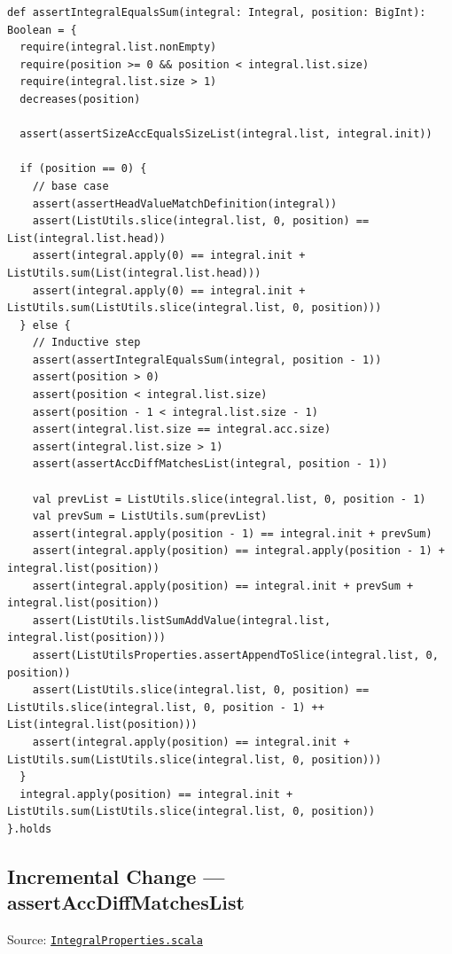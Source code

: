 \begin{lstlisting}[style=scala]
def assertIntegralEqualsSum(integral: Integral, position: BigInt): Boolean = {
  require(integral.list.nonEmpty)
  require(position >= 0 && position < integral.list.size)
  require(integral.list.size > 1)
  decreases(position)

  assert(assertSizeAccEqualsSizeList(integral.list, integral.init))

  if (position == 0) {
    // base case
    assert(assertHeadValueMatchDefinition(integral))
    assert(ListUtils.slice(integral.list, 0, position) == List(integral.list.head))
    assert(integral.apply(0) == integral.init + ListUtils.sum(List(integral.list.head)))
    assert(integral.apply(0) == integral.init + ListUtils.sum(ListUtils.slice(integral.list, 0, position)))
  } else {
    // Inductive step
    assert(assertIntegralEqualsSum(integral, position - 1))
    assert(position > 0)
    assert(position < integral.list.size)
    assert(position - 1 < integral.list.size - 1)
    assert(integral.list.size == integral.acc.size)
    assert(integral.list.size > 1)
    assert(assertAccDiffMatchesList(integral, position - 1))

    val prevList = ListUtils.slice(integral.list, 0, position - 1)
    val prevSum = ListUtils.sum(prevList)
    assert(integral.apply(position - 1) == integral.init + prevSum)
    assert(integral.apply(position) == integral.apply(position - 1) + integral.list(position))
    assert(integral.apply(position) == integral.init + prevSum + integral.list(position))
    assert(ListUtils.listSumAddValue(integral.list, integral.list(position)))
    assert(ListUtilsProperties.assertAppendToSlice(integral.list, 0, position))
    assert(ListUtils.slice(integral.list, 0, position) == ListUtils.slice(integral.list, 0, position - 1) ++ List(integral.list(position)))
    assert(integral.apply(position) == integral.init + ListUtils.sum(ListUtils.slice(integral.list, 0, position)))
  }
  integral.apply(position) == integral.init + ListUtils.sum(ListUtils.slice(integral.list, 0, position))
}.holds
\end{lstlisting}

\subsection{Incremental Change --- assertAccDiffMatchesList}

Source:
\href{https://github.com/thiagomata/prime-numbers/blob/master/src/main/scala/v1/chapter3/list/integral/properties/IntegralProperties.scala}{\texttt{IntegralProperties.scala}}

